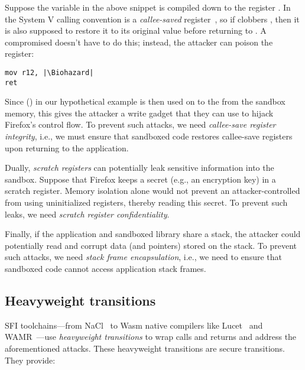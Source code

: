 %
Suppose the  variable in the above  snippet
is compiled down to the register .
%
In the System V calling convention 
is a \emph{callee-saved} register~\cite{system-v},
so if  clobbers
, then it is also supposed to restore it to
its original value before returning to .
%
A compromised \libgraphite doesn't have to do this; instead, the attacker can
poison the register:
%
\begin{lstlisting}[style=asm, escapeinside=||]
mov r12, |\Biohazard|
ret
\end{lstlisting}
%
\noindent Since  () in our hypothetical example
is then used on  to  the
 from the sandbox memory, this gives the attacker a write
gadget that they can use to hijack Firefox's control flow.
%
To prevent such attacks, we need \emph{callee-save register integrity}, i.e.,
we must ensure that sandboxed code restores callee-save registers upon
returning to the application.

%
Dually, \emph{scratch registers} can potentially leak sensitive information
into the sandbox.
%
Suppose that Firefox keeps a secret (e.g., an encryption key) in a
scratch register.
%
Memory isolation alone would not prevent an attacker-controlled \libgraphite
from using uninitialized registers, thereby reading this secret.
%
To prevent such leaks, we need \emph{scratch register confidentiality}.

%
Finally, if the application and sandboxed library share a stack, the attacker
could potentially read and corrupt data (and pointers) stored on the stack.
%
To prevent such attacks, we need \emph{stack frame encapsulation}, i.e., we
need to ensure that sandboxed code cannot access application stack frames.


\subsection{Heavyweight transitions}
\label{sec:background-heavyweight}

SFI toolchains\dash---from NaCl~\cite{yee_native_2009} to Wasm native compilers
like Lucet~\cite{lucet} and WAMR~\cite{wamr}\dash---use \emph{heavyweight
transitions} to wrap calls and returns and address the aforementioned attacks.
%
These heavyweight transitions are secure transitions.
%
They provide:

